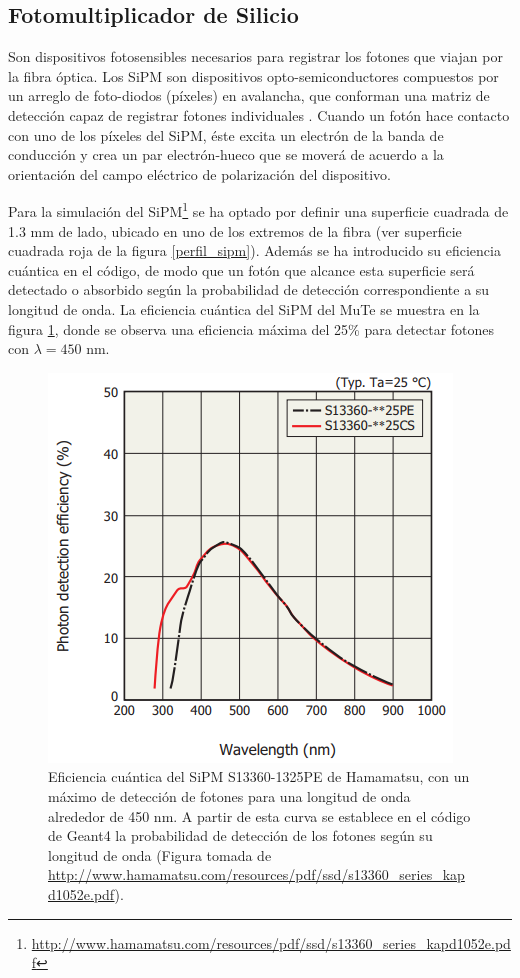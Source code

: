 \documentclass[12pt,oneside,openany,letter]{book}
\begin{document}
\subsection{Fotomultiplicador de Silicio}
Son dispositivos fotosensibles necesarios para registrar los fotones que viajan por la fibra óptica. Los SiPM son dispositivos opto-semiconductores compuestos por un arreglo de foto-diodos (píxeles) en avalancha, que conforman una matriz de detección capaz de registrar fotones individuales \cite{HamamatsuSipmMeasu}. Cuando un fotón hace contacto con uno de los píxeles del SiPM, éste excita un electrón de la banda de conducción y crea un par electrón-hueco que se moverá de acuerdo a la orientación del campo eléctrico de polarización del dispositivo.

Para la simulación del SiPM\footnote{\url{http://www.hamamatsu.com/resources/pdf/ssd/s13360_series_kapd1052e.pdf}} se ha optado por definir una superficie cuadrada de 1.3 mm de lado, ubicado en uno de los extremos de la fibra (ver superficie cuadrada roja de la figura \ref{perfil_sipm}). Además se ha introducido su eficiencia cuántica en el código, de modo que un fotón que alcance esta superficie será detectado o absorbido según la probabilidad de detección correspondiente a su longitud de onda. La eficiencia cu\'antica del SiPM del MuTe se muestra en la figura \ref{QESIPM}, donde se observa una eficiencia máxima del 25\% para detectar fotones con $\lambda = 450$ nm.

\begin{figure}[h!]
    \centering
        \includegraphics[scale=0.7]{QESIPM.png}
   \caption[Eficiencia cuántica del SiPM S13360-1325PE de Hamamatsu]{Eficiencia cuántica del SiPM S13360-1325PE de Hamamatsu, con un máximo de detección de fotones para una longitud de onda alrededor de 450 nm. A partir de esta curva se establece en el c\'odigo de Geant4 la probabilidad de detecci\'on de los fotones seg\'un su longitud de onda (Figura tomada de \url{http://www.hamamatsu.com/resources/pdf/ssd/s13360_series_kapd1052e.pdf}).}\label{QESIPM}
\end{figure}
\end{document}
